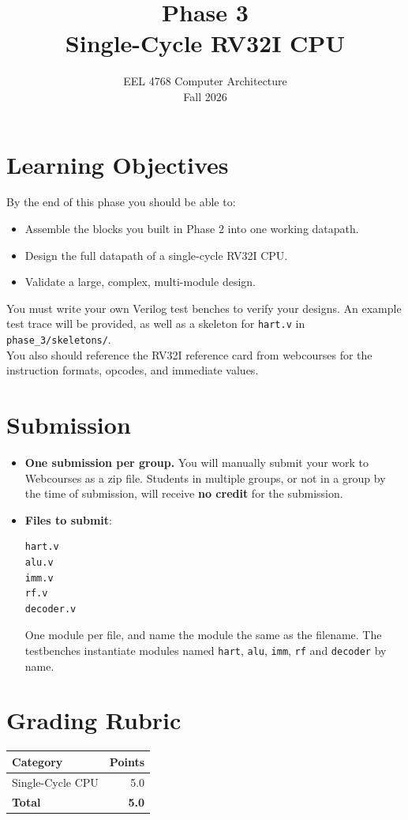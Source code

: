 \documentclass[11pt]{article}
\title{\vspace{-1.5cm}\textbf{Phase 3}\\[2pt]\Large Single-Cycle RV32I CPU}
\author{EEL 4768 Computer Architecture \\ Fall 2026}
\date{}
\begin{document}
\maketitle
\thispagestyle{fancy}
\vspace{-1cm}

\section*{Learning Objectives}
By the end of this phase you should be able to:
\begin{itemize}
  \item Assemble the blocks you built in Phase 2 into one working datapath.
  \item Design the full datapath of a single-cycle RV32I CPU.
  \item Validate a large, complex, multi-module design.
\end{itemize}


\begin{important}
You must write your own Verilog test benches to verify your designs. An example test trace will be provided, as well as a skeleton for \texttt{hart.v} in \texttt{phase\_3/skeletons/}.
\\
You also should reference the RV32I reference card from webcourses for the instruction formats, opcodes, and immediate values.
\end{important}

\section{Submission}
\begin{itemize}
  \item \textbf{One submission per group.} You will manually
        submit your work to Webcourses as a zip file. Students in multiple
        groups, or not in a group by the time of submission, will receive
        \textbf{no credit} for the submission.
  \item \textbf{Files to submit}:
\begin{lstlisting}
hart.v
alu.v
imm.v
rf.v
decoder.v
\end{lstlisting}
        One module per file, and name the module the same as the filename. The testbenches instantiate modules
        named \texttt{hart}, \texttt{alu}, \texttt{imm}, \texttt{rf} and
        \texttt{decoder} by name.
\end{itemize}

\section{Grading Rubric}
\label{sec:rubric}
\begin{center}
\begin{tabular}{@{}lr@{}}
\toprule
\textbf{Category} & \textbf{Points} \\
\midrule
Single-Cycle CPU & 5.0 \\
\midrule
\textbf{Total} & \textbf{5.0} \\
\bottomrule
\end{tabular}
\end{center}
\end{document}
